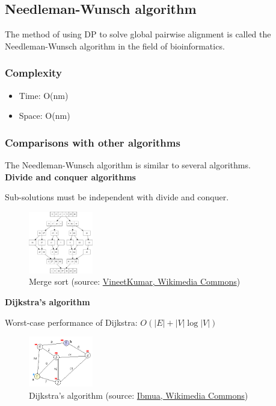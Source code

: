 %
%

%
%
\subsection{Needleman-Wunsch algorithm}
The method of using DP to solve global pairwise alignment is called the Needleman-Wunsch algorithm in the field of bioinformatics. 

%
%
\subsubsection*{Complexity}
\begin{itemize}
\item Time: O(nm)
\item Space: O(nm)
\end{itemize}

%
%
\subsubsection*{Comparisons with other algorithms}
The Needleman-Wunsch algorithm is similar to several algorithms.
\\

\noindent
\textbf{Divide and conquer algorithms}

\noindent
Sub-solutions must be independent with divide and conquer.

\begin{figure}[H]
  \centering
      \includegraphics[width=0.25\textwidth]{fig02/Merge_sort_algorithm.png}
  \caption{Merge sort (source: \href{https://commons.wikimedia.org/w/index.php?curid=8004317}{VineetKumar, Wikimedia Commons})}
\end{figure}

\noindent
\textbf{Dijkstra's algorithm}

\noindent
Worst-case performance of Dijkstra: $O(|E|+|V|\log |V|)$

\begin{figure}[H]
  \centering
      \includegraphics[width=0.25\textwidth]{fig02/Dijkstra.png}
  \caption{Dijkstra's algorithm (source: \href{https://commons.wikimedia.org/w/index.php?curid=6282617}{Ibmua, Wikimedia Commons})}
\end{figure}

%
